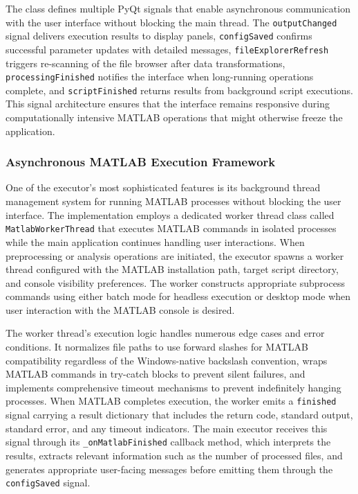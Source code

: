 \documentclass[12pt]{report}
\begin{document}
The class defines multiple PyQt signals that enable asynchronous communication with the user interface without blocking the main thread. The \verb|outputChanged| signal delivers execution results to display panels, \verb|configSaved| confirms successful parameter updates with detailed messages, \verb|fileExplorerRefresh| triggers re-scanning of the file browser after data transformations, \verb|processingFinished| notifies the interface when long-running operations complete, and \verb|scriptFinished| returns results from background script executions. This signal architecture ensures that the interface remains responsive during computationally intensive MATLAB operations that might otherwise freeze the application.

\subsubsection{Asynchronous MATLAB Execution Framework}

One of the executor's most sophisticated features is its background thread management system for running MATLAB processes without blocking the user interface. The implementation employs a dedicated worker thread class called \verb|MatlabWorkerThread| that executes MATLAB commands in isolated processes while the main application continues handling user interactions. When preprocessing or analysis operations are initiated, the executor spawns a worker thread configured with the MATLAB installation path, target script directory, and console visibility preferences. The worker constructs appropriate subprocess commands using either batch mode for headless execution or desktop mode when user interaction with the MATLAB console is desired.

The worker thread's execution logic handles numerous edge cases and error conditions. It normalizes file paths to use forward slashes for MATLAB compatibility regardless of the Windows-native backslash convention, wraps MATLAB commands in try-catch blocks to prevent silent failures, and implements comprehensive timeout mechanisms to prevent indefinitely hanging processes. When MATLAB completes execution, the worker emits a \verb|finished| signal carrying a result dictionary that includes the return code, standard output, standard error, and any timeout indicators. The main executor receives this signal through its \verb|_onMatlabFinished| callback method, which interprets the results, extracts relevant information such as the number of processed files, and generates appropriate user-facing messages before emitting them through the \verb|configSaved| signal.
\end{document}
